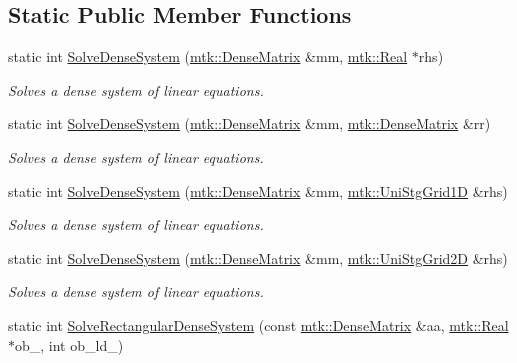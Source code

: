 \subsection*{Static Public Member Functions}
\begin{DoxyCompactItemize}
\item 
static int \hyperlink{classmtk_1_1LAPACKAdapter_a7428bccf74fd4a4af68fb7233846da22}{Solve\+Dense\+System} (\hyperlink{classmtk_1_1DenseMatrix}{mtk\+::\+Dense\+Matrix} \&mm, \hyperlink{group__c01-roots_gac080bbbf5cbb5502c9f00405f894857d}{mtk\+::\+Real} $\ast$rhs)
\begin{DoxyCompactList}\small\item\em Solves a dense system of linear equations. \end{DoxyCompactList}\item 
static int \hyperlink{classmtk_1_1LAPACKAdapter_af0723bba1d73450119d093b9cf1ff6f0}{Solve\+Dense\+System} (\hyperlink{classmtk_1_1DenseMatrix}{mtk\+::\+Dense\+Matrix} \&mm, \hyperlink{classmtk_1_1DenseMatrix}{mtk\+::\+Dense\+Matrix} \&rr)
\begin{DoxyCompactList}\small\item\em Solves a dense system of linear equations. \end{DoxyCompactList}\item 
static int \hyperlink{classmtk_1_1LAPACKAdapter_ac38be1e30a2456b2a14c8a81f47c4ba1}{Solve\+Dense\+System} (\hyperlink{classmtk_1_1DenseMatrix}{mtk\+::\+Dense\+Matrix} \&mm, \hyperlink{classmtk_1_1UniStgGrid1D}{mtk\+::\+Uni\+Stg\+Grid1\+D} \&rhs)
\begin{DoxyCompactList}\small\item\em Solves a dense system of linear equations. \end{DoxyCompactList}\item 
static int \hyperlink{classmtk_1_1LAPACKAdapter_a6c040471a1e9256bafa74e3603ff7bf5}{Solve\+Dense\+System} (\hyperlink{classmtk_1_1DenseMatrix}{mtk\+::\+Dense\+Matrix} \&mm, \hyperlink{classmtk_1_1UniStgGrid2D}{mtk\+::\+Uni\+Stg\+Grid2\+D} \&rhs)
\begin{DoxyCompactList}\small\item\em Solves a dense system of linear equations. \end{DoxyCompactList}\item 
static int \hyperlink{classmtk_1_1LAPACKAdapter_a380f148ffdf96bae2f79ae28f1a6560c}{Solve\+Rectangular\+Dense\+System} (const \hyperlink{classmtk_1_1DenseMatrix}{mtk\+::\+Dense\+Matrix} \&aa, \hyperlink{group__c01-roots_gac080bbbf5cbb5502c9f00405f894857d}{mtk\+::\+Real} $\ast$ob\+\_\+, int ob\+\_\+ld\+\_\+)

\end{DoxyCompactItemize}
